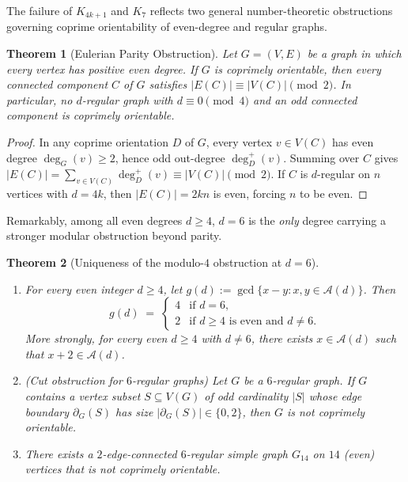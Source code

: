 \documentclass[11pt,a4paper]{article}
\newtheorem{theorem}{Theorem}[section]
\theoremstyle{definition}
\theoremstyle{remark}
\newcommand{\outdeg}{\deg^{+}}
\newcommand{\Aset}{\mathcal{A}}
\begin{document}
The failure of $K_{4k+1}$ and $K_7$ reflects two general number-theoretic obstructions governing coprime orientability of even-degree and regular graphs.

\begin{theorem}[Eulerian Parity Obstruction]\label{thm:eulerian}
Let $G = (V, E)$ be a graph in which every vertex has positive even degree. If $G$ is coprimely orientable, then every connected component $C$ of $G$ satisfies $|E(C)| \equiv |V(C)| \pmod{2}$. In particular, no $d$-regular graph with $d \equiv 0 \pmod{4}$ and an odd connected component is coprimely orientable.
\end{theorem}

\begin{proof}
In any coprime orientation $D$ of $G$, every vertex $v \in V(C)$ has even degree $\deg_G(v) \ge 2$, hence odd out-degree $\outdeg_D(v)$. Summing over $C$ gives $|E(C)| = \sum_{v \in V(C)} \outdeg_D(v) \equiv |V(C)| \pmod{2}$. If $C$ is $d$-regular on $n$ vertices with $d = 4k$, then $|E(C)| = 2kn$ is even, forcing $n$ to be even.
\end{proof}

Remarkably, among all even degrees $d \ge 4$, $d = 6$ is the \emph{only} degree carrying a stronger modular obstruction beyond parity.

\begin{theorem}[Uniqueness of the modulo-$4$ obstruction at $d = 6$]\label{thm:mod4}
\leavevmode
\begin{enumerate}[label=(\alph*)]
  \item For every even integer $d \ge 4$, let $g(d) := \gcd\{x - y : x, y \in \Aset(d)\}$. Then
  \[
    g(d) \;=\;
    \begin{cases}
      4 & \text{if } d = 6,\\
      2 & \text{if } d \ge 4 \text{ is even and } d \neq 6.
    \end{cases}
  \]
  More strongly, for every even $d \ge 4$ with $d \neq 6$, there exists $x \in \Aset(d)$ such that $x + 2 \in \Aset(d)$.
  \item (\emph{Cut obstruction for $6$-regular graphs}) Let $G$ be a $6$-regular graph. If $G$ contains a vertex subset $S \subseteq V(G)$ of odd cardinality $|S|$ whose edge boundary $\partial_G(S)$ has size $|\partial_G(S)| \in \{0, 2\}$, then $G$ is not coprimely orientable.
  \item There exists a $2$-edge-connected $6$-regular simple graph $G_{14}$ on $14$ (even) vertices that is not coprimely orientable.
\end{enumerate}
\end{theorem}
\end{document}
